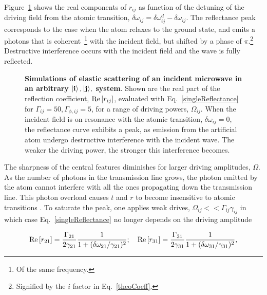   Figure~\ref{singleDriveReflection} shows the real components of $ r_{ij} $ as function of the detuning of the driving field from the atomic transition, $ \delta\omega_{ij} = \delta\omega_{ij}^{d}-\delta\omega_{ij}$. The reflectance peak corresponds to the case when the atom relaxes to the ground state, and emits a photons that is coherent~\footnote{Of the same frequency.} with the incident field, but shifted by a phase of $ \pi $.\footnote{Signified by the $ i $ factor in Eq.~\eqref{theoCoeff}.} Destructive interference occurs with the incident field and the wave is fully reflected.
  
  \begin{figure}
  	\caption{\small \textbf{Simulations of elastic scattering of an incident microwave in an arbitrary $ \mathbf{\ket{i}, \ket{j}}, $ system}. Shown are the real part of the reflection coefficient, $ \text{Re}\left[r_{ij}\right] $, evaluated with Eq.~\eqref{singleReflectance} for $ \Gamma_{ij}=50, \Gamma_{\phi,ij}=5 $, for a range of driving powers, $ \Omega_{ij} $. When the incident field is on resonance with the atomic transition, $ \delta\omega_{ij}=0  $, the reflectance curve exhibits a peak, as emission from the artificial atom undergo destructive interference with the incident wave. The weaker the driving power, the stronger this interference becomes.}
  	\label{singleDriveReflection}
  \end{figure}

  The sharpness of the central features diminishes for larger driving amplitudes, $ \Omega $. As the number of photons in the transmission line grows, the photon emitted by the atom cannot interfere with all the ones propagating down the transmission line. This photon overload causes $ t $ and $ r $ to become insensitive to atomic transitions \cite{DemonstrationofaSinglePhotonRouter}.  To saturate the peak, one applies weak drives, $ \Omega_{ij}<<\Gamma_{ij}\gamma_{ij} $ in which case Eq.~\eqref{singleReflectance} no longer depends on the driving amplitude
  
\begin{equation}
	  \begin{aligned}
	  	\text{Re}\left[r_{21}\right] = \frac{\Gamma_{21}}{2\gamma_{21}}\frac{1}{1+(\delta\omega_{21}/\gamma_{21})^2}; \quad \text{Re}\left[r_{31}\right]=\frac{\Gamma_{31}}{2\gamma_{31}}\frac{1}{1+(\delta\omega_{31}/\gamma_{31})^2},
	  \end{aligned}
	  \label{singleLorentzian}
  \end{equation}
  
